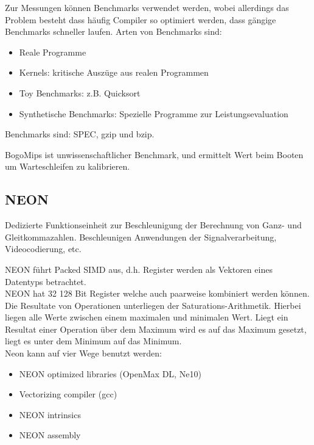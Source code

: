 \documentclass[a4paper,12pt,leqno]{article}
\begin{document}
Zur Messungen können Benchmarks verwendet werden, wobei allerdings das Problem besteht dass häufig Compiler so optimiert werden, dass gängige Benchmarks schneller laufen. Arten von Benchmarks sind:
\begin{itemize}
\item Reale Programme
\item Kernels: kritische Auszüge aus realen Programmen
\item Toy Benchmarks: z.B. Quicksort
\item Synthetische Benchmarks: Spezielle Programme zur Leistungsevaluation
\end{itemize}

Benchmarks sind: SPEC, gzip und bzip.

BogoMips ist unwissenschaftlicher Benchmark, und ermittelt Wert beim Booten um Warteschleifen zu kalibrieren.

\subsection{NEON}

Dedizierte Funktionseinheit zur Beschleunigung der Berechnung von Ganz- und Gleitkommazahlen.
Beschleunigen Anwendungen der Signalverarbeitung, Videocodierung, etc.

NEON führt Packed SIMD aus, d.h. Register werden als Vektoren eines Datentyps betrachtet.\\
NEON hat 32 128 Bit Register welche auch paarweise kombiniert werden können.\\

Die Resultate von Operationen unterliegen der Saturations-Arithmetik.  Hierbei liegen alle Werte zwischen einem maximalen und minimalen Wert. Liegt ein Resultat einer Operation über dem Maximum wird es auf das Maximum gesetzt, liegt es unter dem Minimum auf das Minimum.\\

Neon kann auf vier Wege benutzt werden:
\begin{itemize}
\item NEON optimized libraries (OpenMax DL, Ne10)
\item Vectorizing compiler (gcc)
\item NEON intrinsics
\item NEON assembly
\end{itemize}
\end{document}
